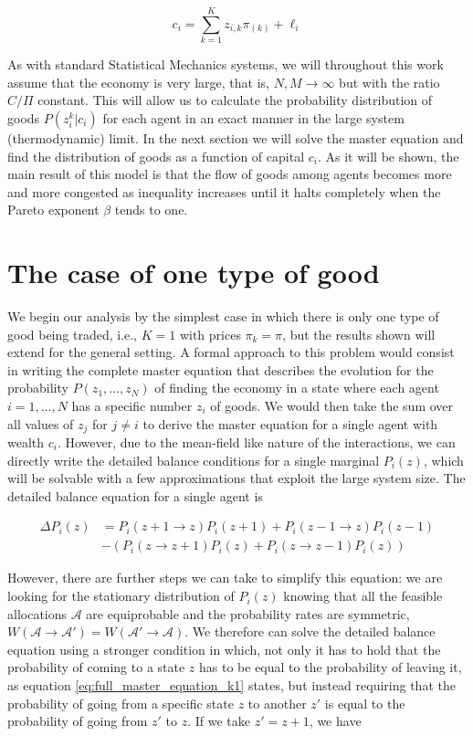 \begin{equation}
c_i =  \sum_{k=1}^K z_{i , k} \pi_{(k)} + \ell_i
\end{equation}

As with standard Statistical Mechanics systems, we will throughout this work assume that the economy is very large, that is, $N, M \to \infty$ but with the ratio $C/\Pi$ constant. This will allow us to calculate the probability distribution of goods $P (z_i^k | c_i)$ for each agent in an exact manner in the large system (thermodynamic) limit. In the next section we will solve the master equation and find the distribution of goods as a function of capital $c_i$. As it will be shown, the main result of this model is that the flow of goods among agents becomes more and more congested as inequality increases until it halts completely when the Pareto exponent $\beta$ tends to one.


\section{The case of one type of good}

We begin our analysis by the simplest case in which there is only one type of good being traded, i.e., $K=1$ with prices $\pi_k = \pi$, but the results shown will extend for the general setting. A formal approach to this problem would consist in writing the complete master equation that describes the evolution for the probability $P(z_1,\ldots, z_N)$ of finding the economy in a state where each agent $i=1,\ldots,N$ has a specific number $z_i$ of goods. We would then take the sum over all values of $z_j$ for $j\neq i$ to derive the master equation for a single agent with wealth $c_i$. However, due to the mean-field like nature of the interactions, we can directly write the detailed balance conditions for a single marginal $P_i(z)$, which will be solvable with a few approximations that exploit the large system size. The detailed balance equation for a single agent is

\begin{align}
\label{eq:full_master_equation_k1}
\Delta P_i(z) & =  P_i(z+1 \to z) P_i(z+1) + P_i(z-1 \to z) P_i(z-1) \\
& - \left(P_i(z \to z + 1) P_i(z) + P_i(z \to z - 1) P_i(z) \right)
\end{align}

However, there are further steps we can take to simplify this equation: we are looking for the stationary distribution of $P_i(z)$ knowing that all the feasible allocations $\mathcal{A}$ are equiprobable and the probability rates are symmetric, $W(\mathcal{A}\to \mathcal{A}') = W(\mathcal{A}'\to \mathcal{A})$. We therefore can solve the detailed balance equation using a stronger condition in which, not only it has to hold that the probability of coming to a state $z$ has to be equal to the probability of leaving it, as equation \eqref{eq:full_master_equation_k1} states, but instead requiring that the probability of going from a specific state $z$ to another $z'$ is equal to the probability of going from $z'$ to $z$. If we take $z' = z + 1$, we have

